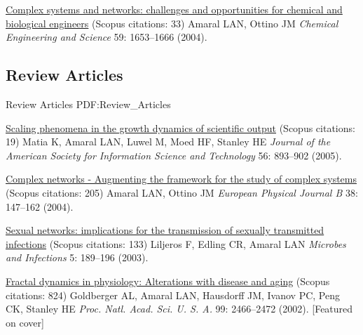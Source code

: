 \NumberedItem{\makebox[0.8cm][r]{[1]}}
\href{/people/amaral/complex-systems-and-networks-challenges-and-opportunities-for-chemical-and-biological-engineers}
{Complex systems and networks: challenges and opportunities for chemical and biological engineers}
    (Scopus citations: 33)
\newline
Amaral LAN, Ottino JM
\newline
\textit{Chemical Engineering and Science}
    59:
1653--1666 (2004).
\newline
\Gap
~
\Gap

\vspace*{0.2cm}\subsection
{Review Articles}
{Review Articles}
{PDF:Review_Articles}

\GapNoBreak
\NumberedItem{\makebox[0.8cm][r]{[7]}}
\href{/people/amaral/scaling-phenomena-in-the-growth-dynamics-of-scientific-output}
{Scaling phenomena in the growth dynamics of scientific output}
    (Scopus citations: 19)
\newline
Matia K, Amaral LAN, Luwel M, Moed HF, Stanley HE
\newline
\textit{Journal of the American Society for Information Science and Technology}
    56:
893--902 (2005).
\newline
\Gap
~
\Gap

\NumberedItem{\makebox[0.8cm][r]{[6]}}
\href{/people/amaral/complex-networks-augmenting-the-framework-for-the-study-of-complex-systems}
{Complex networks - Augmenting the framework for the study of complex systems}
    (Scopus citations: 205)
\newline
Amaral LAN, Ottino JM
\newline
\textit{European Physical Journal B}
    38:
147--162 (2004).
\newline
\Gap
~
\Gap

\NumberedItem{\makebox[0.8cm][r]{[5]}}
\href{/people/amaral/sexual-networks-implications-for-the-transmission-of-sexually-transmitted-infections}
{Sexual networks: implications for the transmission of sexually transmitted infections}
    (Scopus citations: 133)
\newline
Liljeros F, Edling CR, Amaral LAN
\newline
\textit{Microbes and Infections}
    5:
189--196 (2003).
\newline
\Gap
~
\Gap

\NumberedItem{\makebox[0.8cm][r]{[4]}}
\href{/people/amaral/fractal-dynamics-in-physiology-alterations-with-disease-and-aging}
{Fractal dynamics in physiology: Alterations with disease and aging}
    (Scopus citations: 824)
\newline
Goldberger AL, Amaral LAN, Hausdorff JM, Ivanov PC, Peng CK, Stanley HE
\newline
\textit{Proc. Natl. Acad. Sci. U. S. A.}
    99:
2466--2472 (2002).
    [Featured on cover]
\newline
\Gap
~
\Gap

